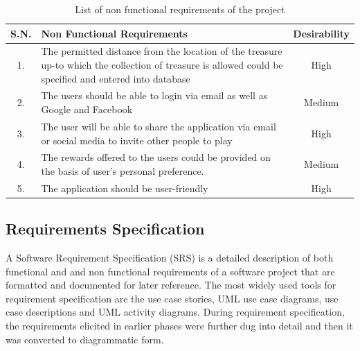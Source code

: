\documentclass[12pt, a4paper, oneside]{article}
\begin{document}
\begin{table}[H]
\begin{tabularx}{\linewidth}{|c|X|c|}
\hline
\rowcolor[HTML]{C0C0C0} 
{\color[HTML]{000000} S.N.} & {\color[HTML]{000000} Non Functional Requirements}                                                                                                      & {\color[HTML]{000000} Desirability} \\ \hline
1.                          & The permitted distance from the location of the treasure up-to which the collection of treasure is allowed could be specified and entered into database & High                                \\ \hline
2.                          & The users should be able to login via email as well as Google and Facebook                                                                              & Medium                              \\ \hline
3.                          & The user will be able to share the application via email or social media to invite other people to play                                                 & High                                \\ \hline
4.                          & The rewards offered to the users could be provided on the basis of user's personal preference.                                                          & Medium                              \\ \hline
5.                          & The application should be user-friendly                                               & High                              \\ \hline
\end{tabularx}
\caption{List of non functional requirements of the project}
\label{table:nonfuncreq}
\end{table}


\subsection{Requirements Specification}
A Software Requirement Specification (SRS) is a detailed description of both functional and and non functional requirements of a software project that are formatted and documented for later reference. The most widely used tools for requirement specification are the use case stories, UML use case diagrams, use case descriptions and UML activity diagrams. During requirement specification, the requirements elicited in earlier phases were further dug into detail and then it was converted to diagrammatic form. 
\end{document}
